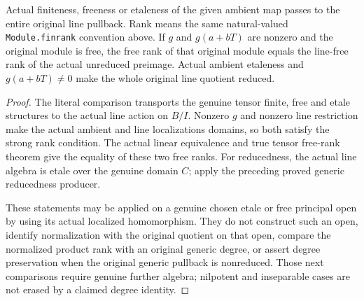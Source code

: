 \begin{theorem}
\label{algebra:line-tensor-free-rank-etale}
\leanok
{}
Actual finiteness, freeness or etaleness of the given ambient map
passes to the entire original line pullback. Rank means the same
natural-valued \texttt{Module.finrank} convention above. If $g$ and $g(a+bT)$
are nonzero and the original module is free, the free rank of that
original module equals the line-free rank of the actual unreduced
preimage. Actual ambient etaleness and $g(a+bT)\ne0$ make the whole
original line quotient reduced.
\end{theorem}
\begin{proof}
The literal comparison transports the genuine tensor finite, free and
etale structures to the actual line action on $B/I$. Nonzero $g$ and
nonzero line restriction make the actual ambient and line localizations
domains, so both satisfy the strong rank condition. The actual linear
equivalence and true tensor free-rank theorem give the equality of
these two free ranks. For reducedness, the actual line algebra is
etale over the genuine domain $C$; apply the preceding proved generic
reducedness producer.

These statements may be applied on a genuine chosen etale or free
principal open by using its actual localized homomorphism. They do
not construct such an open, identify normalization with the original
quotient on that open, compare the normalized product rank with an
original generic degree, or assert degree preservation when the
original generic pullback is nonreduced. Those next comparisons
require genuine further algebra; nilpotent and inseparable cases
are not erased by a claimed degree identity.
\end{proof}
